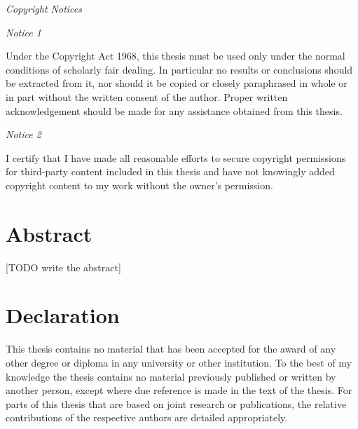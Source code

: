 \begin{center}
\begin{minipage}{0.95\textwidth}

\begin{center}
\textit{Copyright Notices}
\end{center}

{\textit{Notice 1}}

Under the Copyright Act 1968, this thesis must be used only under the normal conditions of scholarly fair dealing.
In particular no results or conclusions should be extracted from it, nor should it be copied or closely paraphrased in whole or in part without the written consent of the author.
Proper written acknowledgement should be made for any assistance obtained from this thesis.

\bigskip

{\textit {Notice 2}}

I certify that I have made all reasonable efforts to secure copyright permissions for third-party content included in this thesis and have not knowingly added copyright content to my work without the owner's permission.

\end{minipage}
\end{center}

\vspace*{\fill}
\vspace*{\fill}

\chapter*{Abstract}

[TODO write the abstract]

\chapter*{Declaration}

This thesis contains no material that has been accepted for the award of any other degree or diploma in any university or other institution. To the best of my knowledge the thesis contains no material previously published or written by another person, except where due reference is made in the text of the thesis. For parts of this thesis that are based on joint research or publications, the relative contributions of the respective authors are detailed appropriately.

